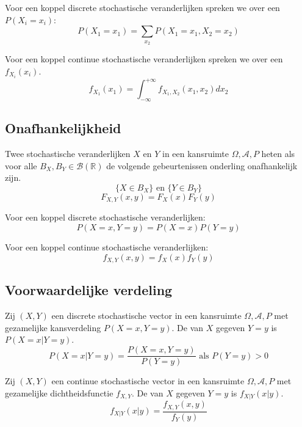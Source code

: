 \documentclass[main.tex]{subfiles}
\begin{document}
  Voor een koppel discrete stochastische veranderlijken spreken we over een  $P(X_{i} = x_{i})$:
  \[ P(X_{1}=x_{1}) = \sum_{x_{2}}P(X_{1}=x_{1},X_{2}=x_{2}) \]


  Voor een koppel continue stochastische veranderlijken spreken we over een  $f_{X_{i}}(x_{i})$.
  \[ f_{X_{1}}(x_{1}) = \int_{-\infty}^{+\infty}f_{X_{1},X_{2}}(x_{1},x_{2})dx_{2} \]


\subsection{Onafhankelijkheid}
\label{sec:onafhankelijkheid}

\begin{de}
  Twee stochastische veranderlijken $X$ en $Y$ in een kansruimte $\Omega,\mathcal{A},P$ heten  als voor alle $B_{X},B_{Y} \in \mathcal{B}(\mathbb{R})$ de volgende gebeurtenissen onderling onafhankelijk zijn.
  \[ \{ X \in B_{X}\} \text{ en } \{ Y \in B_{Y} \} \]
  \[ F_{X,Y}(x,y) = F_{X}(x)F_{Y}(y) \]
\end{de}


  Voor een koppel discrete stochastische veranderlijken:
  \[ P(X=x,Y=y) = P(X=x)P(Y=y) \]



  Voor een koppel continue stochastische veranderlijken:
  \[ f_{X,Y}(x,y) = f_{X}(x)f_{Y}(y) \]



\subsection{Voorwaardelijke verdeling}
\label{sec:voorw-verd}

\begin{de}
  Zij $(X,Y)$ een discrete stochastische vector in een kansruimte $\Omega,\mathcal{A},P$ met gezamelijke kansverdeling $P(X=x,Y=y)$.
  De  van $X$ gegeven $Y=y$ is $P(X=x|Y=y)$.
  \[
  P(X=x|Y=y) = \frac{P(X=x,Y=y)}{P(Y=y)} \text{ als } P(Y=y) > 0
  \]
\end{de}

\begin{de}
  Zij $(X,Y)$ een continue stochastische vector in een kansruimte $\Omega,\mathcal{A},P$ met gezamelijke dichtheidsfunctie $f_{X,Y}$.
  De  van $X$ gegeven $Y=y$ is $f_{X|Y}(x|y)$.
  \[
  f_{X|Y}(x|y) = \frac{f_{X,Y}(x,y)}{f_{Y}(y)}
  \]
\end{de}
\end{document}
